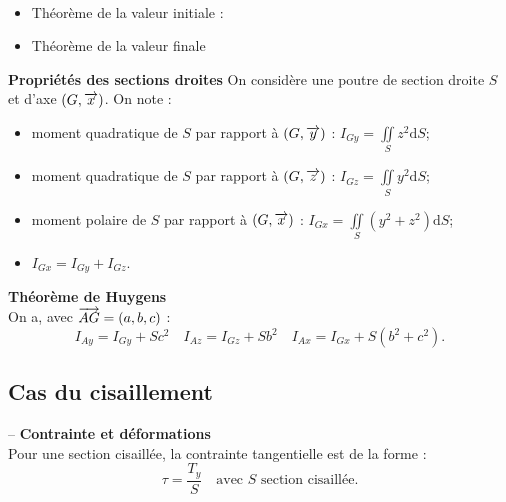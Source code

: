 \documentclass[10pt,fleqn]{article} %
\begin{document}
\begin{defi} 

\end{defi}


\begin{theorem} ~\\
\begin{itemize}[label=,font=\color{ocre}] 
\item Théorème de la valeur initiale :
\item Théorème de la valeur finale
\end{itemize}
\end{theorem}


\begin{prop}
\textbf{Propriétés des sections droites}
On considère une poutre de section droite $S$ et d'axe $\left(G,\overrightarrow{x} \right)$. On note :
\begin{itemize}
\item moment quadratique de $S$ par rapport à $\left(G,\overrightarrow{y} \right)$ : $I_{Gy} = \iint\limits_S z^2 \text{d}S$;
\item moment quadratique de $S$ par rapport à $\left(G,\overrightarrow{z} \right)$ : $I_{Gz} = \iint\limits_S y^2 \text{d}S$;
\item moment polaire de $S$ par rapport à $\left(G,\overrightarrow{x} \right)$ : $I_{Gx} = \iint\limits_S \left( y^2 + z^2 \right) \text{d}S$;
\item $I_{Gx}=I_{Gy}+I_{Gz}$.
\end{itemize}
\end{prop}

\begin{theorem}
\textbf{Théorème de Huygens} ~\\
On a, avec $\overrightarrow{AG}=\left(a,b,c \right)$ :
$$
I_{Ay}=I_{Gy} + Sc^2 
\quad 
I_{Az}=I_{Gz} + Sb^2 
\quad 
I_{Ax}=I_{Gx} + S\left(b^2+c^2 \right). 
$$
\end{theorem}

\subsection*{Cas du cisaillement}

\begin{defi} -- 
\textbf{Contrainte et déformations} ~\\

Pour une section cisaillée, la contrainte tangentielle est de la forme : 
$$
\tau = \dfrac{T_y}{S} \quad \text{avec } S \text{ section cisaillée.}
$$
\end{defi}
\end{document}
